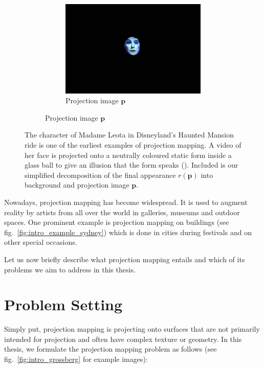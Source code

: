 \begin{figure}
\begin{subfigure}{0.3\textwidth}
        \begin{subfigure}{\textwidth}
            \centering
            \includegraphics[width=\textwidth]{images/01-Leota-only_head.jpg}
            \caption*{Projection image \(\bm{p}\)}
        \end{subfigure}
    \end{subfigure}
    \caption{The character of Madame Leota in Disneyland's Haunted Mansion ride is one of the earliest examples of projection mapping. A video of her face is projected onto a neutrally coloured static form inside a glass ball to give an illusion that the form speaks (\citet{MadameLeota}). Included is our simplified decomposition of the final appearance \(r(\bm{p})\) into background and projection image \(\bm{p}\).}
    \label{fig:intro_example_leota}
\end{figure}

Nowadays, projection mapping has become widespread. It is used to augment reality by artists from all over the world in galleries, museums and outdoor spaces. One prominent example is projection mapping on buildings (see fig.~\ref{fig:intro_example_sydney}) which is done in cities during festivals and on other special occasions.

Let us now briefly describe what projection mapping entails and which of its problems we aim to address in this thesis.

\section{Problem Setting}
\label{section:intro-problem_setting}

Simply put, projection mapping is projecting onto surfaces that are not primarily intended for projection and often have complex texture or geometry. In this thesis, we formulate the projection mapping problem as follows (see fig.~\ref{fig:intro_grossberg} for example images):

